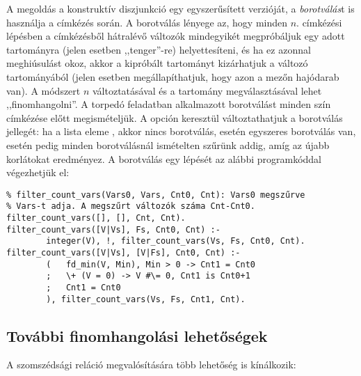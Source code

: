 A megoldás a konstruktív diszjunkció egy egyszerűsített verzióját, a \emph{borotválás}t
is használja a címkézés során. A borotválás lényege az, hogy minden $n$. címkézési
lépésben a címkézésből hátralévő változók mindegyikét megpróbáljuk egy adott
tartományra (jelen esetben ,,tenger''-re) helyettesíteni, és ha ez azonnal meghiúsulást
okoz, akkor a kipróbált tartományt kizárhatjuk a változó tartományából (jelen esetben
megállapíthatjuk, hogy azon a mezőn hajódarab van). A módszert $n$ változtatásával
és a tartomány megválasztásával lehet ,,finomhangolni''. A torpedó feladatban alkalmazott
borotválást minden szín címkézése előtt megismételjük. A 
opción keresztül változtathatjuk a borotválás jellegét: ha a lista eleme ,
akkor nincs borotválás,  esetén egyszeres borotválás van,  esetén
pedig minden borotválásnál ismételten szűrünk addig, amíg az újabb korlátokat eredményez.
\br
A borotválás egy lépését az alábbi programkóddal végezhetjük el:
\begin{verbatim}
% filter_count_vars(Vars0, Vars, Cnt0, Cnt): Vars0 megszűrve
% Vars-t adja. A megszűrt változók száma Cnt-Cnt0.
filter_count_vars([], [], Cnt, Cnt).
filter_count_vars([V|Vs], Fs, Cnt0, Cnt) :-
        integer(V), !, filter_count_vars(Vs, Fs, Cnt0, Cnt).
filter_count_vars([V|Vs], [V|Fs], Cnt0, Cnt) :-
        (   fd_min(V, Min), Min > 0 -> Cnt1 = Cnt0
        ;   \+ (V = 0) -> V #\= 0, Cnt1 is Cnt0+1
        ;   Cnt1 = Cnt0
        ), filter_count_vars(Vs, Fs, Cnt1, Cnt).
\end{verbatim}

\subsection{További finomhangolási lehetőségek}

A szomszédsági reláció megvalósítására több lehetőség is kínálkozik:

